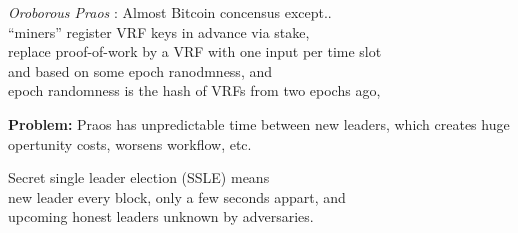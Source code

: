\documentclass{beamer}
\begin{document}
\begin{frame}


\emph{Oroborous Praos} : Almost Bitcoin concensus except.. \\ \smallskip
\hspace{10pt} ``miners'' register VRF keys in advance via stake, \\ \smallskip
\hspace{10pt} replace proof-of-work by a VRF with one input per time slot  \\ \smallskip
\hspace{20pt} and based on some epoch ranodmness, and  \\ \smallskip
\hspace{10pt} epoch randomness is the hash of VRFs from two epochs ago, \\ \smallskip



\bigskip\bigskip\medskip

{\bf Problem:}  Praos has unpredictable time between new leaders, which
 creates huge opertunity costs, worsens workflow, etc.


\end{frame}



\begin{frame}

Secret single leader election (SSLE) means \\ \medskip
\hspace{5pt} new leader every block, only a few seconds appart, and \\ \smallskip
\hspace{5pt} upcoming honest leaders unknown by adversaries.

\end{frame}
\end{document}
